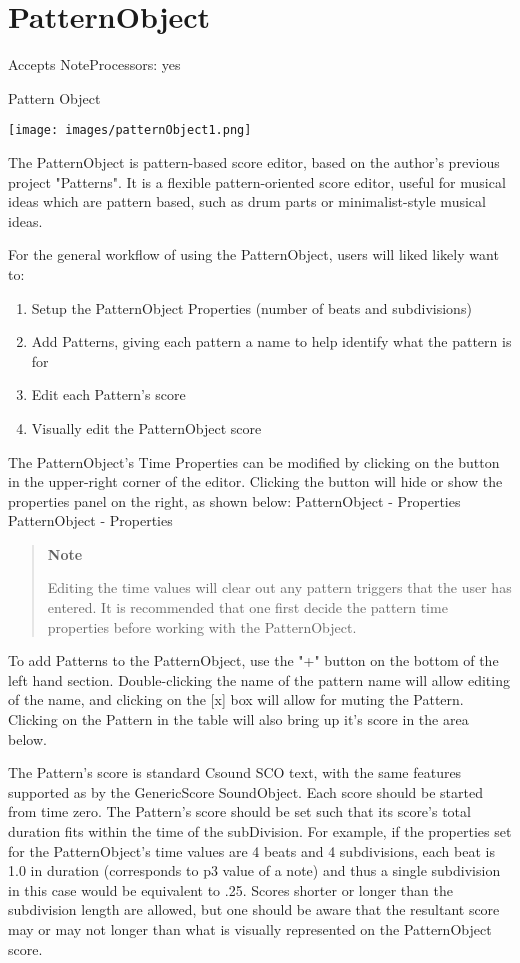 \section{PatternObject}\label{patternObject}

Accepts NoteProcessors: yes

Pattern Object

\texttt{[image: images/patternObject1.png]}

The PatternObject is pattern-based score editor, based on the author's
previous project "Patterns". It is a flexible pattern-oriented score
editor, useful for musical ideas which are pattern based, such as drum
parts or minimalist-style musical ideas.

For the general workflow of using the PatternObject, users will liked
likely want to:

\begin{enumerate}
\def\labelenumi{\arabic{enumi}.}
\item
  Setup the PatternObject Properties (number of beats and subdivisions)
\item
  Add Patterns, giving each pattern a name to help identify what the
  pattern is for
\item
  Edit each Pattern's score
\item
  Visually edit the PatternObject score
\end{enumerate}

The PatternObject's Time Properties can be modified by clicking on the
button in the upper-right corner of the editor. Clicking the button will
hide or show the properties panel on the right, as shown below:
PatternObject - Properties PatternObject - Properties

\begin{quote}
\textbf{Note}

Editing the time values will clear out any pattern triggers that the
user has entered. It is recommended that one first decide the pattern
time properties before working with the PatternObject.
\end{quote}

To add Patterns to the PatternObject, use the "+" button on the bottom
of the left hand section. Double-clicking the name of the pattern name
will allow editing of the name, and clicking on the {[}x{]} box will
allow for muting the Pattern. Clicking on the Pattern in the table will
also bring up it's score in the area below.

The Pattern's score is standard Csound SCO text, with the same features
supported as by the GenericScore SoundObject. Each score should be
started from time zero. The Pattern's score should be set such that its
score's total duration fits within the time of the subDivision. For
example, if the properties set for the PatternObject's time values are 4
beats and 4 subdivisions, each beat is 1.0 in duration (corresponds to
p3 value of a note) and thus a single subdivision in this case would be
equivalent to .25. Scores shorter or longer than the subdivision length
are allowed, but one should be aware that the resultant score may or may
not longer than what is visually represented on the PatternObject score.

